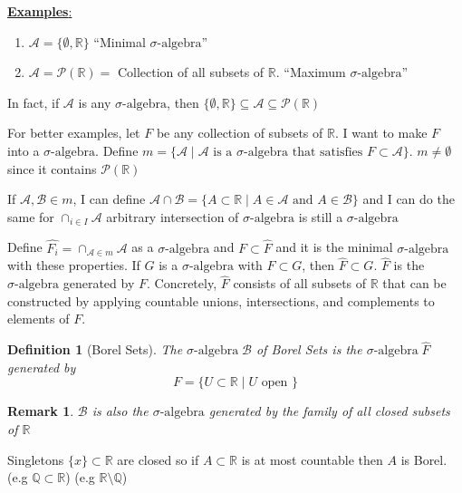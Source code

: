 \documentclass[11pt]{article}
\newtheorem{definition}{Definition}[section]
\newtheorem*{remark}{Remark}
\newcommand{\siga}{\sigma\text{-algebra}}
\begin{document}
    \underline{\textbf{Examples}:}

    \begin{enumerate}
        \item $\mathcal{A} = \{ \emptyset, \mathbb{R} \}$ ``Minimal $\siga$''
        \item $\mathcal{A} = \mathcal{P}(\mathbb{R}) = $ Collection of all subsets of $\mathbb{R}$.
        ``Maximum $\siga$''
    \end{enumerate}

    In fact, if $\mathcal{A}$ is any $\siga$, then $\{ \emptyset,\mathbb{R} \} \subseteq \mathcal{A} \subseteq \mathcal{P}(\mathbb{R})$

    For better examples, let $F$ be any collection of subsets of $\mathbb{R}$.
    I want to make $F$ into a $\siga$.
    Define $m = \{ \mathcal{A} \mid \mathcal{A} \text{ is a } \siga \text{ that satisfies } F \subset \mathcal{A} \}$.
    $m \neq \emptyset$ since it contains $\mathcal{P}(\mathbb{R})$

    If $\mathcal{A}, \mathcal{B} \in m$, I can define $\mathcal{A} \cap \mathcal{B} = \{ A \subset \mathbb{R} \mid A \in \mathcal{A} \text{ and } A \in \mathcal{B} \}$ and I can do the same for $\cap_{i \in I} \mathcal{A}$ arbitrary intersection of $\siga$ is still a $\siga$

    Define $\hat{F_i} = \cap_{\mathcal{A} \in m} \mathcal{A}$ as a $\siga$ and $F \subset \hat{F}$ and it is the minimal $\siga$ with these properties.
    If $G$ is a $\siga$ with $F \subset G$, then $\hat{F} \subset G$.
    $\hat{F}$ is the $\siga$ generated by $F$.
    Concretely, $\hat{F}$ consists of all subsets of $\mathbb{R}$ that can be constructed by applying countable unions, intersections, and complements to elements of $F$.

    \begin{definition}[Borel Sets]
        The $\siga \; \mathcal{B}$ of Borel Sets is the $\siga \; \hat{F}$ generated by
        \[
            F = \{ U \subset \mathbb{R} \mid U \text{ open } \}
        \]
    \end{definition}

    \begin{remark}
        $\mathcal{B}$ is also the $\siga$ generated by the family of all closed subsets of $\mathbb{R}$
    \end{remark}

    Singletons $\{ x \} \subset \mathbb{R}$ are closed so if $A \subset \mathbb{R}$ is at most countable then $A$ is Borel.
    (e.g $\mathbb{Q} \subset \mathbb{R}$) (e.g $\mathbb{R} \setminus \mathbb{Q}$)
\end{document}
